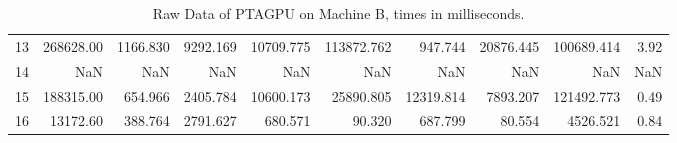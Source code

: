 \begin{table}[ht]
\begin{tabular}{rrrrrrrrrr}
        13 & 268628.00   & 1166.830 & 9292.169  & 10709.775  & 113872.762   & 947.744     & 20876.445    & 100689.414 & 3.92 \\
        14 & NaN         & NaN      & NaN       & NaN        & NaN          & NaN         & NaN          & NaN        & NaN  \\
        15 & 188315.00   & 654.966  & 2405.784  & 10600.173  & 25890.805    & 12319.814   & 7893.207     & 121492.773 & 0.49 \\
        16 & 13172.60    & 388.764  & 2791.627  & 680.571    & 90.320       & 687.799     & 80.554       & 4526.521   & 0.84 \\
        \bottomrule
    \end{tabular}
    \caption{Raw Data of PTAGPU on Machine B, times in milliseconds.}
\end{table}

